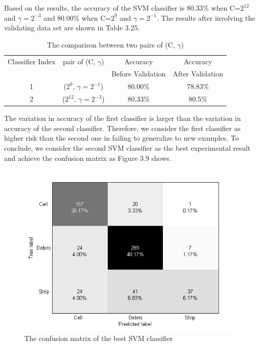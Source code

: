 Based on the results, the accuracy of the SVM classifier is 80.33\% when C=$2^{12}$ and $\gamma = 2^{-3}$ and 80.00\% when C=$2^{9}$ and $\gamma = 2^{-1}$. The results after involving the validating data set are shown in Table 3.25. 
\begin{table}[!h]
\begin{center}
\renewcommand{\arraystretch}{0.8}
\begin{tabular}{|| c | c | c | c ||}
\hline
 Classifier Index & pair of (C, $\gamma$) & Accuracy & Accuracy \\
 & & Before Validation & After Validation \\
\hline
 1 & ($2^{9}$, $\gamma = 2^{-1}$) & 80.00\% & 78.83\% \\
 2 & ($2^{12}$, $\gamma = 2^{-3}$) & 80.33\% & 80.5\% \\
\hline 
\end{tabular}
\end{center}
\caption{The comparison between two pairs of (C, $\gamma$)}
\end{table}
The variation in accuracy of the first classifier is larger than the variation in accuracy of the second classifier. Therefore, we consider the first classifier as higher risk than the second one in failing to generalize to new examples. To conclude, we consider the second SVM classifier as the best experimental result and achieve the confusion matrix as Figure 3.9 shows. 
\begin{figure}[!b]
\includegraphics[width=\linewidth]{fig3_9}
\caption{The confusion matrix of the best SVM classifier}
\end{figure}

